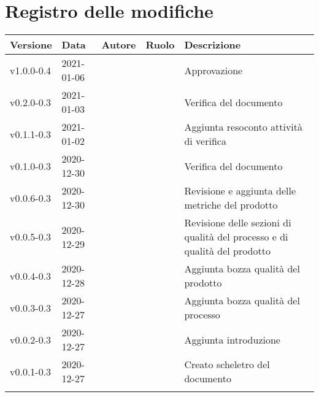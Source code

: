 \section*{\hfil Registro delle modifiche \hfil}
{
	\newlength{\freewidth}
	\setlength{\freewidth}{\dimexpr\textwidth-10\tabcolsep}
	\renewcommand{\arraystretch}{1.5}
	\centering
	\setlength{\aboverulesep}{0pt}
	\setlength{\belowrulesep}{0pt}
	\begin{longtable}{C{.131777\freewidth} C{.134036\freewidth} C{.263554\freewidth} C{.188254\freewidth} C{.282379\freewidth}}
		\toprule 
		\textbf{Versione} & \textbf{Data} & \textbf{Autore} & \textbf{Ruolo} & \textbf{Descrizione}\\
		\toprule
		\endhead
		
		v1.0.0-0.4 & 2021-01-06 & \Daniele & \RdP{} & Approvazione \\
		v0.2.0-0.3 & 2021-01-03 & \Davide \newline \Giosue & \vers & Verifica del documento \\	
		v0.1.1-0.3 & 2021-01-02 & \Lucrezia & \ana & Aggiunta resoconto attività di verifica \\	
		v0.1.0-0.3 & 2020-12-30 & \Daniele & \ver & Verifica del documento \\
		v0.0.6-0.3 & 2020-12-30 & \Francesco & \ana & Revisione e aggiunta delle metriche del prodotto \\
		v0.0.5-0.3 & 2020-12-29 & \Francesco & \ana & Revisione delle sezioni di qualità del processo e di qualità del prodotto \\
		v0.0.4-0.3 & 2020-12-28 & \Francesco & \ana & Aggiunta bozza qualità del prodotto \\
		v0.0.3-0.3 & 2020-12-27 & \Francesco & \ana & Aggiunta bozza qualità del processo \\
		v0.0.2-0.3 & 2020-12-27 & \Lucrezia & \ana & Aggiunta introduzione \\
		v0.0.1-0.3 & 2020-12-27 & \Francesco & \ana & Creato scheletro del documento \\
			
		\bottomrule
		\hiderowcolors
	\end{longtable}
}
